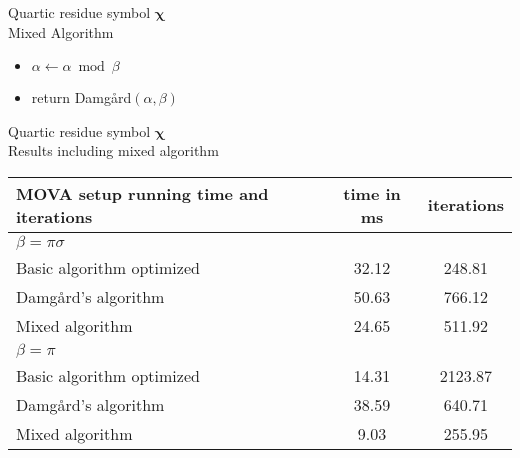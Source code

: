 \documentclass[a4, landscape, slidesonly]{seminar}
\renewcommand{\emph}[1]{{\color{emphcolor} #1}}
\newcommand{\slidetitle}[1]{{\large \color{titlecolor} #1}}
\begin{document}
\begin{slide}
\slidetitle{Quartic residue symbol $\mathbf{\chi}$}
\\[.5cm]


\emph{Mixed Algorithm}
\begin{itemize}
\item[] $\alpha \gets \alpha \bmod \beta~$
\item[] return Damg\aa rd$(\alpha,\beta)$
\end{itemize}
\end{slide}
\begin{slide}
\slidetitle{Quartic residue symbol $\mathbf{\chi}$}
\\[0.7cm]
\emph{Results including mixed algorithm}
 \begin{table}[htb] 
 \begin{tabular}{|l c c|} 
 \hline 
MOVA setup running time and iterations &  {time in ms} &  {iterations}\\ 
  \hline  
 $\beta= \pi \sigma$ & &\\
 \hline  
 Basic algorithm optimized & 32.12 & 248.81\\
 Damg\aa rd's algorithm  &  50.63 & 766.12\\
 Mixed algorithm & 24.65 & 511.92\\
 \hline 
 $\beta= \pi$ & &\\
 \hline
 Basic algorithm optimized & 14.31 & 2123.87\\
 Damg\aa rd's algorithm  &  38.59 & 640.71\\
 Mixed algorithm & 9.03 & 255.95\\
 \hline 
 \end{tabular}
 \end{table}
\end{slide}
\end{document}
